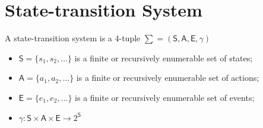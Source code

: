 \section{State-transition System}







A state-transition system is a 4-tuple  $\sum = (\mathsf{S},\mathsf{A},\mathsf{E},\gamma)$
\begin{itemize}
\item $\mathsf{S}=\lbrace s_1,s_2, \dots\rbrace$ is a finite or recursively enumerable set of states;
\item $\mathsf{A}=\lbrace a_1,a_2, \dots\rbrace$ is a finite or recursively enumerable set of actions;
\item $\mathsf{E}=\lbrace e_1,e_2, \dots\rbrace$ is a finite or recursively enumerable set of events;
\item $\gamma:\mathsf{S} \times \mathsf{A} \times \mathsf{E} \to 2^\mathsf{S}$
\end{itemize}

